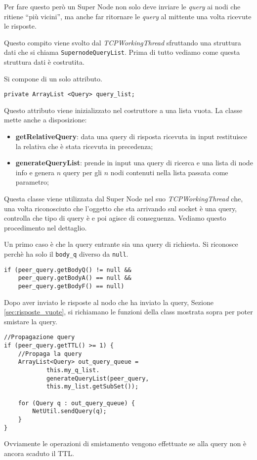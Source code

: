 Per fare questo però un Super Node non solo deve inviare le \emph{query} ai nodi che ritiene ``più vicini'', ma anche far ritornare le \emph{query} al mittente una volta ricevute le risposte.

Questo compito viene svolto dal \emph{TCPWorkingThread} sfruttando una struttura dati che si chiama \verb|SupernodeQueryList|.
Prima di tutto vediamo come questa struttura dati è costrutita.

Si compone di un solo attributo.
\begin{lstlisting}
private ArrayList <Query> query_list;
\end{lstlisting}
Questo attributo viene inizializzato nel costruttore a una lista vuota.
La classe mette anche a disposizione:
\begin{itemize}
 \item \textbf{getRelativeQuery}: data una query di risposta ricevuta in input restituisce la relativa che è stata ricevuta in precedenza;
 \item \textbf{generateQueryList}: prende in input una query di ricerca e una lista di node info e genera $n$ query per gli $n$ nodi contenuti nella lista passata come parametro;
\end{itemize}

Questa classe viene utilizzata dal Super Node nel suo \emph{TCPWorkingThread} che, una volta riconosciuto che l'oggetto che sta arrivando sul socket è una query, controlla che tipo di query è e poi agisce di conseguenza.
Vediamo questo procedimento nel dettaglio.

Un primo caso è che la query entrante sia una query di richiesta. Si riconosce perchè ha solo il \verb|body_q| diverso da \verb|null|.
\begin{lstlisting}
if (peer_query.getBodyQ() != null &&
	peer_query.getBodyA() == null &&
	peer_query.getBodyF() == null) 
\end{lstlisting}

Dopo aver inviato le risposte al nodo che ha inviato la query, Sezione \ref{sec:risposte_vuote}, si richiamano le funzioni della class mostrata sopra per poter smistare la query.
\begin{lstlisting}
//Propagazione query
if (peer_query.getTTL() >= 1) {
	//Propaga la query
	ArrayList<Query> out_query_queue =
			this.my_q_list.
			generateQueryList(peer_query,
			this.my_list.getSubSet());

	for (Query q : out_query_queue) {
		NetUtil.sendQuery(q);
	}
}
\end{lstlisting}
Ovviamente le operazioni di smistamento vengono effettuate se alla query non è ancora scaduto il TTL.

